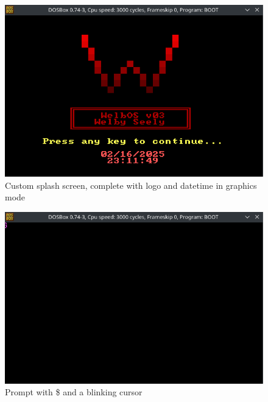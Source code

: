 \documentclass{article}
\begin{document}
    \begin{figure}[H]  %
        \centering
        \includegraphics[width=\textwidth]{splash-screen} %
        \caption{Custom splash screen, complete with logo and datetime in graphics mode}
        \label{fig:1}
    \end{figure}

    \begin{figure}[H]  %
        \centering
        \includegraphics[width=\textwidth]{prompt} %
        \caption{Prompt with \$ and a blinking cursor}
        \label{fig:2}
    \end{figure}
\end{document}
